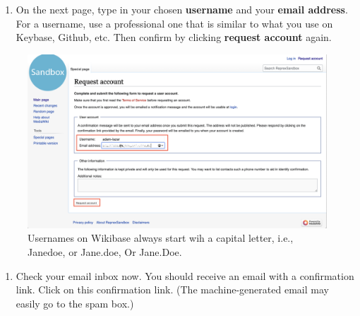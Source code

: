\documentclass[
  letterpaper,
  DIV=11,
  numbers=noendperiod]{scrreprt}
\providecommand{\tightlist}{%
  \setlength{\itemsep}{0pt}\setlength{\parskip}{0pt}}\usepackage{longtable,booktabs,array}
\begin{document}
\begin{enumerate}
\def\labelenumi{\arabic{enumi}.}
\setcounter{enumi}{2}
\tightlist
\item
  On the next page, type in your chosen \textbf{username} and your
  \textbf{email address}. For a username, use a professional one that is
  similar to what you use on Keybase, Github, etc. Then confirm by
  clicking \textbf{request account} again.
\end{enumerate}

\begin{figure}[H]

{\centering \includegraphics{png/wikibase/request-account_2.png}

}

\caption{Usernames on Wikibase always start wih a capital letter, i.e.,
Janedoe, or Jane.doe, Or Jane.Doe.}

\end{figure}%

\begin{enumerate}
\def\labelenumi{\arabic{enumi}.}
\setcounter{enumi}{3}
\tightlist
\item
  Check your email inbox now. You should receive an email with a
  confirmation link. Click on this confirmation link. (The
  machine-generated email may easily go to the spam box.)
\end{enumerate}
\end{document}
